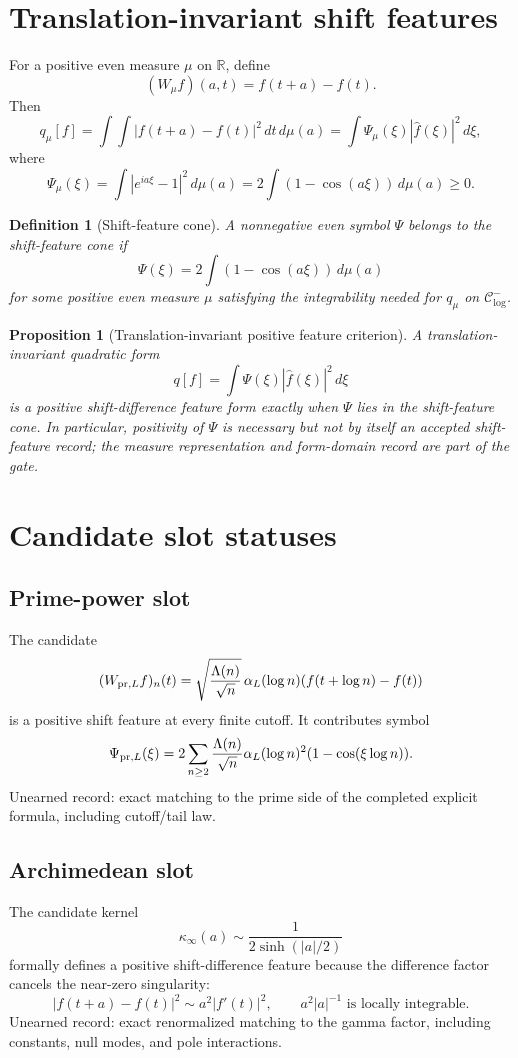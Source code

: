 \documentclass[11pt]{article}
\newtheorem{proposition}{Proposition}
\newtheorem{definition}{Definition}
\newcommand{\Ccore}{\mathcal C^-_{\log}}
\begin{document}
\section{Translation-invariant shift features}

For a positive even measure \(\mu\) on \(\mathbb R\), define
\[
 (W_\mu f)(a,t)=f(t+a)-f(t).
\]
Then
\[
 q_\mu[f]=\int\!\int |f(t+a)-f(t)|^2\,dt\,d\mu(a)
 =\int \Psi_\mu(\xi)|\widehat f(\xi)|^2\,d\xi,
\]
where
\[
 \Psi_\mu(\xi)=\int |e^{ia\xi}-1|^2\,d\mu(a)
 =2\int (1-\cos(a\xi))\,d\mu(a)\ge0.
\]

\begin{definition}[Shift-feature cone]
A nonnegative even symbol \(\Psi\) belongs to the shift-feature cone if
\[
 \Psi(\xi)=2\int (1-\cos(a\xi))\,d\mu(a)
\]
for some positive even measure \(\mu\) satisfying the integrability needed for \(q_\mu\) on \(\Ccore\).
\end{definition}

\begin{proposition}[Translation-invariant positive feature criterion]
A translation-invariant quadratic form
\[
 q[f]=\int \Psi(\xi)|\widehat f(\xi)|^2\,d\xi
\]
is a positive shift-difference feature form exactly when \(\Psi\) lies in the shift-feature cone. In particular, positivity of \(\Psi\) is necessary but not by itself an accepted shift-feature record; the measure representation and form-domain record are part of the gate.
\end{proposition}

\section{Candidate slot statuses}

\subsection*{Prime-power slot}
The candidate
\[
 (W_{{\rm pr},L}f)_n(t)
 =\sqrt{\frac{\Lambda(n)}{\sqrt n}}\,\alpha_L(\log n)(f(t+\log n)-f(t))
\]
is a positive shift feature at every finite cutoff. It contributes symbol
\[
 \Psi_{{\rm pr},L}(\xi)=2\sum_{n\ge2}\frac{\Lambda(n)}{\sqrt n}\alpha_L(\log n)^2(1-\cos(\xi\log n)).
\]
Unearned record: exact matching to the prime side of the completed explicit formula, including cutoff/tail law.

\subsection*{Archimedean slot}
The candidate kernel
\[
 \kappa_\infty(a)\sim \frac1{2\sinh(|a|/2)}
\]
formally defines a positive shift-difference feature because the difference factor cancels the near-zero singularity:
\[
 |f(t+a)-f(t)|^2\sim a^2|f'(t)|^2,
 \qquad a^2|a|^{-1}\text{ is locally integrable.}
\]
Unearned record: exact renormalized matching to the gamma factor, including constants, null modes, and pole interactions.
\end{document}
